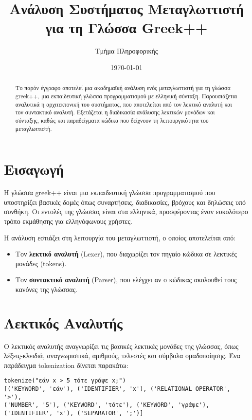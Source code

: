 \documentclass[12pt,a4paper]{article}
\title{\textbf{Ανάλυση Συστήματος Μεταγλωττιστή για τη Γλώσσα Greek++}}
\author{Τμήμα Πληροφορικής}
\date{\today}
\begin{document}
\maketitle


\begin{abstract}
Το παρόν έγγραφο αποτελεί μια ακαδημαϊκή ανάλυση ενός μεταγλωττιστή για τη γλώσσα greek++, μια εκπαιδευτική γλώσσα προγραμματισμού με ελληνική σύνταξη. Παρουσιάζεται αναλυτικά η αρχιτεκτονική του συστήματος, που αποτελείται από τον λεκτικό αναλυτή και τον συντακτικό αναλυτή. Εξετάζεται η διαδικασία ανάλυσης λεκτικών μονάδων και σύνταξης, καθώς και παραδείγματα κώδικα που δείχνουν τη λειτουργικότητα του μεταγλωττιστή.
\end{abstract}


\tableofcontents
\newpage


\section{Εισαγωγή}
Η γλώσσα greek++ είναι μια εκπαιδευτική γλώσσα προγραμματισμού που υποστηρίζει βασικές δομές όπως συναρτήσεις, διαδικασίες, βρόχους και δηλώσεις υπό συνθήκη. Οι εντολές της γλώσσας είναι στα ελληνικά, προσφέροντας έναν ευκολότερο τρόπο εκμάθησης για ελληνόφωνους χρήστες.


Η ανάλυση εστιάζει στη λειτουργία του μεταγλωττιστή, ο οποίος αποτελείται από:
\begin{itemize}
\item Τον \textbf{λεκτικό αναλυτή} (Lexer), που διαχωρίζει τον πηγαίο κώδικα σε λεκτικές μονάδες (tokens).
\item Τον \textbf{συντακτικό αναλυτή} (Parser), που ελέγχει αν ο κώδικας ακολουθεί τους κανόνες της γλώσσας.
\end{itemize}


\section{Λεκτικός Αναλυτής}
Ο λεκτικός αναλυτής αναγνωρίζει τις βασικές λεκτικές μονάδες της γλώσσας, όπως λέξεις-κλειδιά, αναγνωριστικά, αριθμούς, τελεστές και σύμβολα ομαδοποίησης. Ένα παράδειγμα tokenization δίνεται παρακάτω:


\begin{Verbatim}[frame=single, fontsize=\small]
tokenize("εάν x > 5 τότε γράψε x;")
[('KEYWORD', 'εάν'), ('IDENTIFIER', 'x'), ('RELATIONAL_OPERATOR', '>'),
('NUMBER', '5'), ('KEYWORD', 'τότε'), ('KEYWORD', 'γράψε'),
('IDENTIFIER', 'x'), ('SEPARATOR', ';')]
\end{Verbatim}
\end{document}
